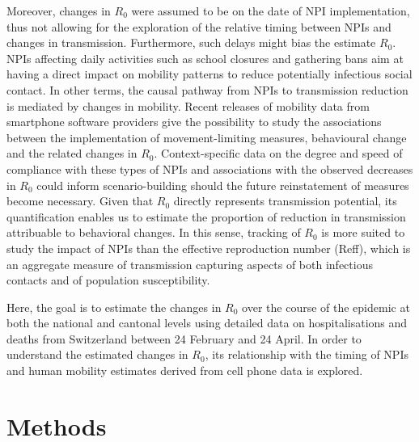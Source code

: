Moreover, changes in $R_0$ were assumed to be on the date of NPI implementation, thus not allowing for the exploration of the relative timing between NPIs and changes in transmission. Furthermore, such delays might bias the estimate $R_0$. NPIs affecting daily activities such as school closures and gathering bans aim at having a direct impact on mobility patterns to reduce potentially infectious social contact. In other terms, the causal pathway from NPIs to transmission reduction is mediated by changes in mobility. Recent releases of mobility data from smartphone software providers give the possibility to study the associations between the implementation of movement-limiting measures, behavioural change and the related changes in $R_0$. Context-specific data on the degree and speed of compliance with these types of NPIs and associations with the observed decreases in $R_0$ could inform scenario-building should the future reinstatement of measures become necessary. Given that $R_0$ directly represents transmission potential, its quantification enables us to estimate the proportion of reduction in transmission attribuable to behavioral changes. In this sense, tracking of $R_0$ is more suited to study the impact of NPIs than the effective reproduction number (Reff), which is an aggregate measure of transmission capturing aspects of both infectious contacts and of population susceptibility. 

Here, the goal is to estimate the changes in $R_0$ over the course of the epidemic at both the national and cantonal levels using detailed data on hospitalisations and deaths from Switzerland between 24 February and 24 April. In order to understand the estimated changes in $R_0$, its relationship with the timing of NPIs and human mobility estimates derived from cell phone data is explored.

\section{Methods}
